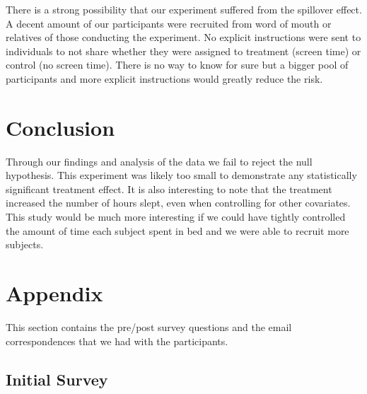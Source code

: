 \documentclass[12pt,]{article}
\begin{document}
There is a strong possibility that our experiment suffered from the
spillover effect. A decent amount of our participants were recruited
from word of mouth or relatives of those conducting the experiment. No
explicit instructions were sent to individuals to not share whether they
were assigned to treatment (screen time) or control (no screen time).
There is no way to know for sure but a bigger pool of participants and
more explicit instructions would greatly reduce the risk.

\section{Conclusion}\label{conclusion}

Through our findings and analysis of the data we fail to reject the null
hypothesis. This experiment was likely too small to demonstrate any
statistically significant treatment effect. It is also interesting to
note that the treatment increased the number of hours slept, even when
controlling for other covariates. This study would be much more
interesting if we could have tightly controlled the amount of time each
subject spent in bed and we were able to recruit more subjects.

\section{Appendix}\label{appendix}

This section contains the pre/post survey questions and the email
correspondences that we had with the participants.

\subsection{Initial Survey}\label{initial-survey}
\end{document}
